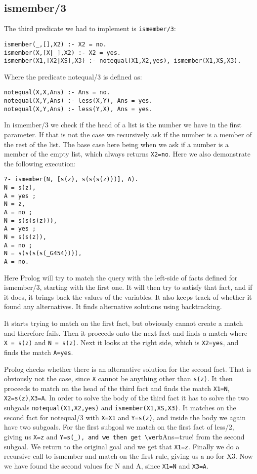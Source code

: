 \documentclass[a4paper,10pt]{article}
\begin{document}
\subsection{ismember/3}
The third predicate we had to implement is \verb=ismember/3=:
\begin{verbatim}
ismember(_,[],X2) :- X2 = no.
ismember(X,[X|_],X2) :- X2 = yes.
ismember(X1,[X2|XS],X3) :- notequal(X1,X2,yes), ismember(X1,XS,X3).
\end{verbatim}
Where the predicate notequal/3 is defined as:
\begin{verbatim}
notequal(X,X,Ans) :- Ans = no.
notequal(X,Y,Ans) :- less(X,Y), Ans = yes.
notequal(X,Y,Ans) :- less(Y,X), Ans = yes.
\end{verbatim}
In ismember/3 we check if the head of a list is the number we have in the first parameter. If that is not the case we recursively ask if the number is a member of the rest of the list. The base case here being when we ask if a number is a member of the empty list, which always returns \verb!X2=no!. Here we also demonstrate the following execution:
\begin{verbatim}
?- ismember(N, [s(z), s(s(s(z)))], A).
N = s(z),
A = yes ;
N = z,
A = no ;
N = s(s(s(z))),
A = yes ;
N = s(s(z)),
A = no ;
N = s(s(s(s(_G454)))),
A = no.
\end{verbatim}
Here Prolog will try to match the query with the left-side of facts defined for ismember/3, starting with the first one. It will then try to satisfy that fact, and if it does, it brings back the values of the variables. It also keeps track of whether it found any alternatives. It finds alternative solutions using backtracking.

It starts trying to match on the first fact, but obviously cannot create a match and therefore fails. Then it proceeds onto the next fact and finds a match where \verb!X = s(z)! and \verb!N = s(z)!. Next it looks at the right side, which is \verb!X2=yes!, and finds the match \verb!A=yes!.

Prolog checks whether there is an alternative solution for the second fact. That is obviously not the case, since \verb=X= cannot be anything other than \verb=s(z)=. It then proceeds to match on the head of the third fact and finds the match \verb!X1=N!, \verb!X2=s(z)!,\verb!X3=A!. In order to solve the body of the third fact it has to solve the two subgoals \verb=notequal(X1,X2,yes)= and \verb=ismember(X1,XS,X3)=. It matches on the second fact for notequal/3 with \verb!X=X1! and \verb!Y=s(z)!, and inside the body we again have two subgoals. For the first subgoal we match on the first fact of less/2, giving us \verb!X=z! and \verb!Y=s(_), and we then get \verb!Ans=true! from the second subgoal. We return to the original goal and we get that \verb!X1=z!. Finally we do a recursive call to ismember and match on the first rule, giving us a no for X3. Now we have found the second values for N and A, since \verb!X1=N! and \verb!X3=A!.
\end{document}
